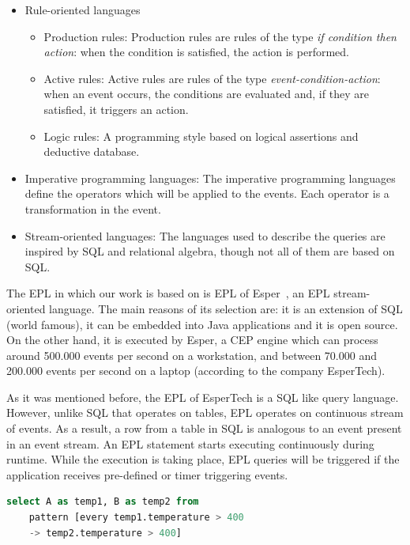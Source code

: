 \documentclass[conference]{IEEEtran}
\theoremstyle{definition}
\begin{document}
\begin{itemize}
 \item Rule-oriented languages
 \begin{itemize}
 \item Production rules: Production rules are rules of the type \textit{if condition then action}: when the condition is satisfied, the action is performed.
 \item Active rules: Active rules are rules of the type \textit{event-condition-action}: when an event occurs, the conditions are evaluated and, if they are satisfied, 
 it triggers an action.
 \item Logic rules: A programming style based on logical assertions and deductive database. 
 \end{itemize}
 \item Imperative programming languages: The imperative programming languages define the operators which will be applied to the events. Each operator is a
 transformation in the event.
 \item Stream-oriented languages: The languages used to describe the queries are inspired by SQL and relational algebra, though not all of them are 
 based on SQL.
\end{itemize}

The EPL in which our work is based on is EPL of Esper~\cite{Esper:2016}, an EPL stream-oriented language. The main reasons of its selection are: 
it is an extension of SQL (world famous), it can be embedded into Java applications and it is open source. On the other hand, it is executed by Esper, a
CEP engine which can process around 500.000 events per second on a workstation, and between 70.000 and 200.000 events per second on a laptop (according to 
the company EsperTech).
 
As it was mentioned before, the EPL of EsperTech is a SQL like query language. However, unlike SQL that operates on tables, EPL operates on continuous stream of events. As a 
result, a row from a table in SQL is analogous to an event present in an event stream. An EPL statement starts executing continuously during 
runtime. While the execution is taking place, EPL queries will be triggered if the application receives pre-defined or timer triggering events.
 
 \renewcommand{\lstlistingname}{Example}
 
 \begin{lstlisting}[basicstyle=\ttfamily\footnotesize,language=SQL,caption=EPL of EsperTech query example,label=EPLqueries]
  select A as temp1, B as temp2 from 
    pattern [every temp1.temperature > 400 
    -> temp2.temperature > 400]
 \end{lstlisting}
 
\end{document}
